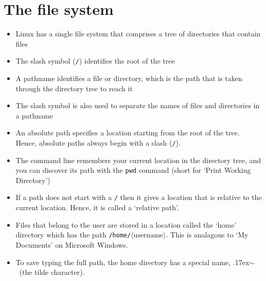 \documentclass[a4paper,twoside,titlepage]{memoir}
\newcommand{\shellcmd}{\texttt}
\newcommand{\shellvar}[1]{$\langle \text{#1}\rangle$}
\newcommand{\home}{\raise.17ex\hbox{$\scriptstyle\mathtt{\sim}$}}
\begin{document}
\section{The file system}
\begin{itemize}
\item Linux has a single file system that comprises a tree of directories that contain files
\item The slash symbol (\shellcmd{/}) identifies the root of the tree
\item A pathname identifies a file or directory, which is the path that is taken through the directory tree to reach it
\item The slash symbol is also used to separate the names of files and directories in a pathname
\item An absolute path specifies a location starting from the root of the tree.  Hence, absolute paths always begin with a slash (\shellcmd{/}).
\item The command line remembers your current location in the directory tree, and you can discover its path with the \shellcmd{pwd} command (short for `Print Working Directory')
\item If a path does not start with a \shellcmd{/} then it gives a location that is relative to the current location.  Hence, it is called a `relative path'.
\item Files that belong to the user are stored in a location called the `home' directory which has the path \shellcmd{/home/\shellvar{username}}.  This is analagous to `My Documents' on Microsoft Windows.
\item To save typing the full path, the home directory has a special name, \home\ (the tilde character).
\end{itemize}
\end{document}
